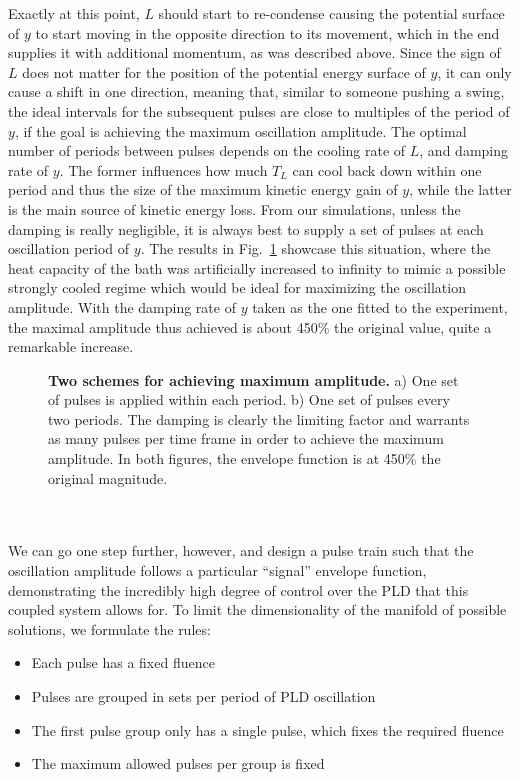 Exactly at this point, $L$ should start to re-condense causing the potential surface of $y$ to start moving in the opposite direction to its movement, which in the end supplies it with additional momentum, as was described above.
Since the sign of $L$ does not matter for the position of the potential energy surface of $y$, it can only cause a shift in one direction, meaning that, similar to someone pushing a swing, the ideal intervals for the subsequent pulses are close to multiples of the period of $y$, if the goal is achieving the maximum oscillation amplitude.
The optimal number of periods between pulses depends on the cooling rate of $L$, and damping rate of $y$.
The former influences how much $T_L$ can cool back down within one period and thus the size of the maximum kinetic energy gain of $y$, while the latter is the main source of kinetic energy loss. From our simulations, unless the damping is really negligible, it is always best to supply a set of pulses at each oscillation period of $y$.
The results in Fig.~\ref{fig:Cr_maximum_amp} showcase this situation, where the heat capacity of the bath was artificially increased to infinity to mimic a possible strongly cooled regime which would be ideal for maximizing the oscillation amplitude.
With the damping rate of $y$ taken as the one fitted to the experiment, the maximal amplitude thus achieved is about 450\% the original value, quite a remarkable increase.  
\begin{figure}
	\caption{\label{fig:Cr_maximum_amp} {\bf Two schemes for achieving maximum amplitude.} a) One set of pulses is applied within each period. b) One set of pulses every two periods. The damping is clearly the limiting factor and warrants as many pulses per time frame in order to achieve the maximum amplitude. In both figures, the envelope function is at 450\% the original magnitude.}
\end{figure}
\\\\
We can go one step further, however, and design a pulse train such that the oscillation amplitude follows a particular ``signal'' envelope function, demonstrating the incredibly high degree of control over the PLD that this coupled system allows for.  
To limit the dimensionality of the manifold of possible solutions, we formulate the rules:
\begin{itemize}
	\item Each pulse has a fixed fluence
	\item Pulses are grouped in sets per period of PLD oscillation
	\item The first pulse group only has a single pulse, which fixes the required fluence
	\item The maximum allowed pulses per group is fixed
\end{itemize}
